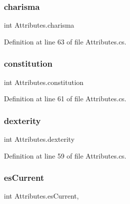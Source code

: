 \subsubsection{\texorpdfstring{charisma}{charisma}}
{\footnotesize\ttfamily int Attributes.\+charisma\hspace{0.3cm}{\ttfamily [get]}}



Definition at line 63 of file Attributes.\+cs.

\mbox{\label{class_attributes_a5788ff85cda31bb47f02aa274d330523}} 
\subsubsection{\texorpdfstring{constitution}{constitution}}
{\footnotesize\ttfamily int Attributes.\+constitution\hspace{0.3cm}{\ttfamily [get]}}



Definition at line 61 of file Attributes.\+cs.

\mbox{\label{class_attributes_ab0d80932c197709933e76e1a9faefcca}} 
\subsubsection{\texorpdfstring{dexterity}{dexterity}}
{\footnotesize\ttfamily int Attributes.\+dexterity\hspace{0.3cm}{\ttfamily [get]}}



Definition at line 59 of file Attributes.\+cs.

\mbox{\label{class_attributes_a3375ff1328de584253cee341d9bec06d}} 
\subsubsection{\texorpdfstring{esCurrent}{esCurrent}}
{\footnotesize\ttfamily int Attributes.\+es\+Current\hspace{0.3cm}{\ttfamily [get]}, {\ttfamily [set]}}



